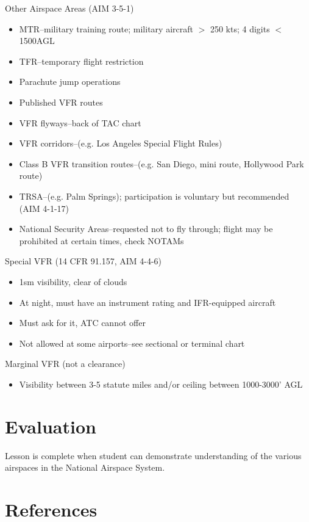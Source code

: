 \documentclass[twoside,openright]{report}
\begin{document}
Other Airspace Areas (AIM 3-5-1)
\begin{itemize}
  \item MTR--military training route; military aircraft $>$ 250 kts; 4 digits $<$
    1500AGL
  \item TFR--temporary flight restriction
  \item Parachute jump operations
  \item Published VFR routes
  \item VFR flyways--back of TAC chart
  \item VFR corridors--(e.g. Los Angeles Special Flight Rules)
  \item Class B VFR transition routes--(e.g. San Diego, mini route, Hollywood
    Park route)
  \item TRSA--(e.g. Palm Springs); participation is voluntary but recommended
    (AIM 4-1-17)
  \item National Security Areas--requested not to fly through; flight may be
    prohibited at certain times, check NOTAMs
\end{itemize}

Special VFR (14 CFR 91.157, AIM 4-4-6)
\begin{itemize}
  \item 1sm visibility, clear of clouds
  \item At night, must have an instrument rating and IFR-equipped aircraft
  \item Must ask for it, ATC cannot offer
  \item Not allowed at some airports--see sectional or terminal chart
\end{itemize}

Marginal VFR (not a clearance)
\begin{itemize}
  \item Visibility between 3-5 statute miles and/or ceiling between 1000-3000' AGL
\end{itemize}

\section{Evaluation}

Lesson is complete when student can demonstrate understanding of the various
airspaces in the National Airspace System.

\section{References}
\end{document}
